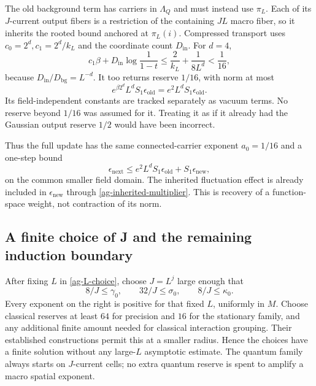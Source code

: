 \documentclass[11pt]{article}
\theoremstyle{remark}
\begin{document}
The old background term has carriers in $\Lambda_Q$ and
must instead use $\pi_L$. Each of its $J$-current output
fibers is a restriction of the containing $JL$ macro fiber,
so it inherits the rooted bound anchored at $\pi_L(i)$.
Compressed transport uses $c_0=2^d,c_1=2^d/k_L$ and
the coordinate count $D_{\mathrm{in}}$. For $d=4$,
\begin{equation}\label{ag-old-transport-budget}
 c_1\beta+D_{\mathrm{in}}\log\frac1{1-t}
 \le\frac2{k_L}+\frac1{8L^d}<\frac1{16},
\end{equation}
because $D_{\mathrm{in}}/D_{\mathrm{bg}}=L^{-d}$.
It too returns reserve $1/16$, with norm at most
\begin{equation}\label{ag-old-transport}
 e^{\beta2^d}L^d S_1\epsilon_{\mathrm{old}}
       =e^2L^d S_1\epsilon_{\mathrm{old}}.
\end{equation}
Its field-independent constants are tracked separately as
vacuum terms. No reserve beyond $1/16$ was assumed for it.
Treating it as if it already had the Gaussian output reserve
$1/2$ would have been incorrect.

Thus the full update has the same connected-carrier exponent
$a_0=1/16$ and a one-step bound
\begin{equation}\label{ag-weight-recurrence}
 \epsilon_{\mathrm{next}}
 \le e^2L^dS_1\epsilon_{\mathrm{old}}
                     +S_1\epsilon_{\mathrm{new}},
\end{equation}
on the common smaller field domain. The inherited
fluctuation effect is already included in
$\epsilon_{\mathrm{new}}$ through
\eqref{ag-inherited-multiplier}. This is recovery of a
function-space weight, not contraction of its norm.

\subsection{A finite choice of J and the remaining induction boundary}

After fixing $L$ in \eqref{ag-L-choice}, choose $J=L^j$
large enough that
\begin{equation}\label{ag-J-choice}
 8/J\le\gamma_0,\qquad32/J\le\sigma_0,\qquad
 8/J\le\kappa_0.
\end{equation}
Every exponent on the right is positive for that fixed $L$,
uniformly in $M$. Choose classical reserves at least $64$
for precision and $16$ for the stationary family, and any
additional finite amount needed for classical interaction
grouping. Their established constructions permit this at
a smaller radius. Hence the choices have a finite solution
without any large-$L$ asymptotic estimate. The quantum
family always starts on $J$-current cells; no extra quantum
reserve is spent to amplify a macro spatial exponent.
\end{document}
